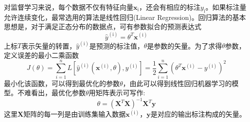 对监督学习来说，每个数据不仅有特征向量$\mathbf{x}_{\mathrm{i}}$，还会有相应的标注$y_{\mathrm{i}}$。如果标注量允许连续变化，最常选用的算法是线性回归\textrm{(Linear Regression)}。回归算法的基本思想是，对于满足正态分布的数据点，可有参数拟合的预测表达式
\begin{equation}
	\hat y^{(\mathrm{i})}=\theta^T\mathbf{x}^{(\mathrm{i})}
	\label{eq:linear_eq}
\end{equation}
上标$T$表示矢量的转置，$\hat y^{(\mathrm{i})}$是预测的标注值，$\theta$是参数的矢量。为了求得$\theta$参数，定义误差的最小二乘函数
\begin{equation}
	J(\theta)=\sum_{i=1}^nL[\hat{y}^{(\mathrm{i})}(\mathbf{x}^{(\mathrm{i})},\theta),y^{(\mathrm{i})}]=\dfrac12\sum_{i=1}^n(\theta^T\mathbf{x}^{(\mathrm{i})}-y^{(\mathrm{i})})^2
	\label{eq:linear_2}
\end{equation}
最小化该函数，可以得到最优化的参数$\theta$，由此可以得到线性回归机器学习的模型。不难看出，最优化参数$\theta$用矩阵表示可写作:~
\begin{displaymath}
	\theta=(\mathbf{X}^T\mathbf{X})^{-1}\mathbf{X}^T\mathbf{y}
\end{displaymath}
这里$\mathbf{X}$矩阵的每一列是由训练集输入数据$\mathbf{x}^{(\mathrm{i})}$，$\mathbf{y}$是对应的输出标注构成的矢量。

